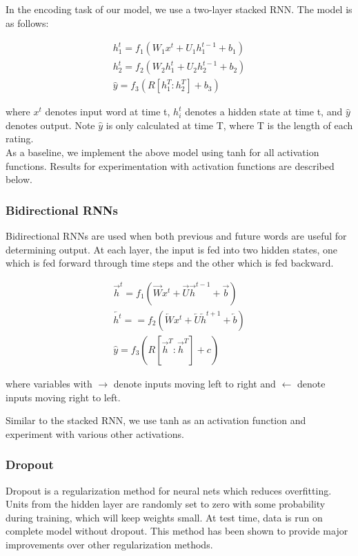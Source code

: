 \documentclass{article} %
\begin{document}
In the encoding task of our model, we use a two-layer stacked RNN. The model is
as follows:

\begin{gather}
h_1^t = f_1(W_1 x^t + U_1 h_1^{t-1} + b_1) \\
h_2^t = f_2(W_2 h_1^t + U_2 h_2^{t-1} + b_2) \\
\hat{y} = f_3(R[h_1^T:h_2^T] + b_3)
\end{gather}

where $x^t$ denotes input word at time t, $h_i^t$ denotes a hidden state at time
t, and $\hat{y}$ denotes output. Note $\hat{y}$ is only calculated at time T,
where T is the length of each rating. \\

As a baseline, we implement the above model using tanh for all activation
functions. Results for experimentation with activation functions are described
below.

\subsubsection{Bidirectional RNNs}

Bidirectional RNNs are used when both previous and future words are useful for
determining output. At each layer, the input is fed into two hidden states, one
which is fed forward through time steps and the other which is fed backward.

\begin{gather}
\overrightarrow{h}^t = 
f_1(\overrightarrow{W} x^t + 
\overrightarrow{U} \overrightarrow{h}^{t-1} + 
\overrightarrow{b}) \\
\overleftarrow{h^t} = 
= f_2(\overleftarrow{W} x^t + 
\overleftarrow{U} \overleftarrow{h}^{t+1} + 
\overleftarrow{b}) \\ 
\hat{y} = 
f_3(R[\overrightarrow{h}^T:\overrightarrow{h}^T] + c)
\end{gather}

where variables with $\rightarrow$ denote inputs moving left to right and
$\leftarrow$ denote inputs moving right to left.

Similar to the stacked RNN, we use tanh as an activation function and experiment
with various other activations.

\subsubsection{Dropout}

Dropout is a regularization method for neural nets which reduces overfitting.
Units from the hidden layer are randomly set to zero with some probability
during training, which will keep weights small. At test time, data is run on
complete model without dropout. This method has been shown to provide major
improvements over other regularization methods.
\end{document}
